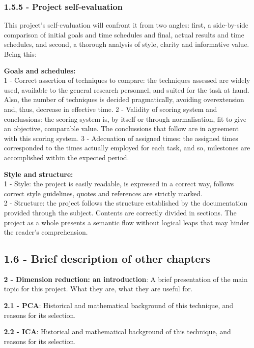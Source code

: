 \documentclass[]{article}
\begin{document}
\subsubsection{1.5.5 - Project
self-evaluation}\label{project-self-evaluation}

This project's self-evaluation will confront it from two angles: first,
a side-by-side comparison of initial goals and time schedules and final,
actual results and time schedules, and second, a thorough analysis of
style, clarity and informative value. Being this:

\textbf{Goals and schedules:}\\1 - Correct assertion of techniques to
compare: the techniques assessed are widely used, available to the
general research personnel, and suited for the task at hand. Also, the
number of techniques is decided pragmatically, avoiding overextension
and, thus, decrease in effective time. 2 - Validity of scoring system
and conclussions: the scoring system is, by itself or through
normalisation, fit to give an objective, comparable value. The
conclussions that follow are in agreement with this scoring system. 3 -
Adecuation of assigned times: the assigned times corresponded to the
times actually employed for each task, and so, milestones are
accomplished within the expected period.

\textbf{Style and structure:}\\1 - Style: the project is easily
readable, is expressed in a correct way, follows correct style
guidelines, quotes and references are strictly marked.\\2 - Structure:
the project follows the structure established by the documentation
provided through the subject. Contents are correctly divided in
sections. The project as a whole presents a semantic flow without
logical leaps that may hinder the reader's comprehension.

\subsection{1.6 - Brief description of other
chapters}\label{brief-description-of-other-chapters}

\textbf{2 - Dimension reduction: an introduction}: A brief presentation
of the main topic for this project. What they are, what they are useful
for.

\textbf{2.1 - PCA}: Historical and mathematical background of this
technique, and reasons for its selection.

\textbf{2.2 - ICA}: Historical and mathematical background of this
technique, and reasons for its selection.
\end{document}
